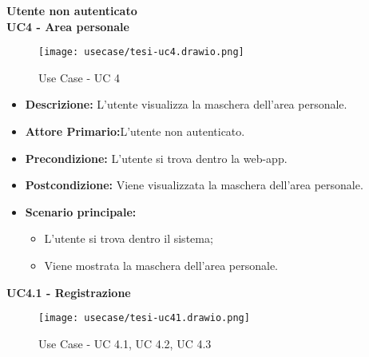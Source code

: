 \textbf{Utente non autenticato}\\
\textbf{UC4 - Area personale}
\begin{figure}[H]
    \centering
    \texttt{[image: usecase/tesi-uc4.drawio.png]}
    \caption{Use Case - UC 4}
\end{figure}
\begin{itemize}
    \item \textbf{Descrizione:} L'utente visualizza la maschera dell'area personale.
    \item \textbf{Attore Primario:}L'utente non autenticato.
    \item \textbf{Precondizione:} L'utente si trova dentro la web-app.
    \item \textbf{Postcondizione:} Viene visualizzata la maschera dell'area personale.
    \item \textbf{Scenario principale:}
    \begin{itemize}
        \item L'utente si trova dentro il sistema;
        \item Viene mostrata la maschera dell'area personale.
    \end{itemize}
\end{itemize}
\textbf{UC4.1 - Registrazione}
\begin{figure}[H]
    \centering
    \texttt{[image: usecase/tesi-uc41.drawio.png]}
    \caption{Use Case - UC 4.1, UC 4.2, UC 4.3}
\end{figure}
